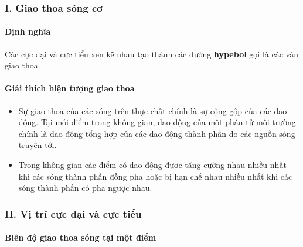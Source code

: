 \subsubsection*{I. Giao thoa sóng cơ}
\paragraph{Định nghĩa}
Các cực đại và cực tiểu xen kẽ nhau tạo thành các đường \textbf{hypebol} gọi là các vân giao thoa.
\paragraph{Giải thích hiện tượng giao thoa} 
\immini
{
\begin{itemize}
\item Sự giao thoa của các sóng trên thực chất chính là sự cộng gộp của các dao động. Tại mỗi điểm trong không gian, dao động của một phần tử môi trường chính là dao động tổng hợp của các dao động thành phần do các nguồn sóng truyền tới. 
\item Trong không gian các điểm có dao động được tăng cường nhau nhiều nhất khi các sóng thành phần đồng pha hoặc bị hạn chế nhau nhiều nhất khi các sóng thành phần có pha ngược nhau.
\end{itemize}
\subsubsection*{II. Vị trí cực đại và cực tiểu} 
\setcounter{paragraph}{0}
\paragraph{Biên độ giao thoa sóng tại một điểm}}
